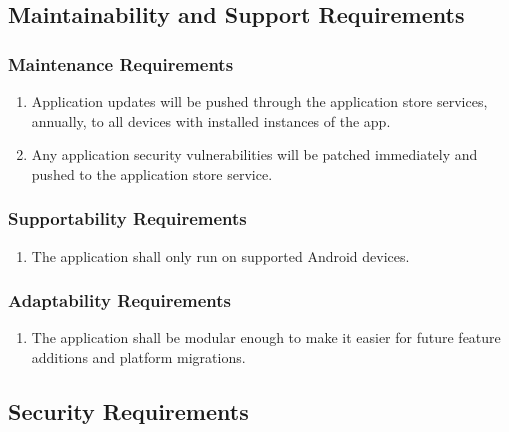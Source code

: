\documentclass[titlepage]{article}
\begin{document}

\subsection{Maintainability and Support Requirements}
\label{sub:maintainability_and_support_requirements}

\subsubsection{Maintenance Requirements}
\label{ssub:maintenance_requirements}
\begin{enumerate}[{MS}1. ]
    \item Application updates will be pushed through the application store services, annually, to
    all devices with installed instances of the app.
    \item Any application security vulnerabilities will be patched immediately and pushed to the
    application store service.
\end{enumerate}

\subsubsection{Supportability Requirements}
\label{ssub:supportability_requirements}
\begin{enumerate}[{MS}1. ]
	\item The application shall only run on supported Android devices.
\end{enumerate}

\subsubsection{Adaptability Requirements}
\label{ssub:adaptability_requirements}
\begin{enumerate}[{MS}1. ]
    \item The application shall be modular enough to make it easier for future feature additions and
    platform migrations.
\end{enumerate}


\subsection{Security Requirements}
\label{sub:security_requirements}
\end{document}
